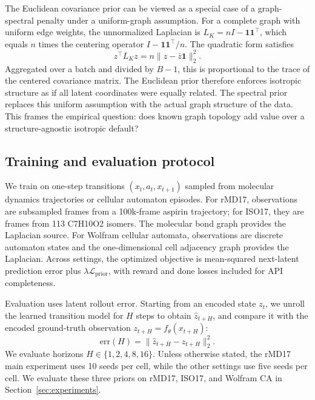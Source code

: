 The Euclidean covariance prior can be viewed as a special case of a graph-spectral penalty under a uniform-graph assumption. For a complete graph with uniform edge weights, the unnormalized Laplacian is \(L_K = n I - \mathbf{1}\mathbf{1}^\top\), which equals \(n\) times the centering operator \(I - \mathbf{1}\mathbf{1}^\top/n\). The quadratic form satisfies
\begin{equation}
z^\top L_K z = n \|z-\bar{z}\mathbf{1}\|_2^2 .
\end{equation}
Aggregated over a batch and divided by \(B-1\), this is proportional to the trace of the centered covariance matrix. The Euclidean prior therefore enforces isotropic structure as if all latent coordinates were equally related. The spectral prior replaces this uniform assumption with the actual graph structure of the data. This frames the empirical question: does known graph topology add value over a structure-agnostic isotropic default?

\subsection{Training and evaluation protocol}\label{sec:protocol}

We train on one-step transitions \((x_t,a_t,x_{t+1})\) sampled from molecular dynamics trajectories or cellular automaton episodes. For rMD17, observations are subsampled frames from a 100k-frame aspirin trajectory; for ISO17, they are frames from 113 C7H10O2 isomers. The molecular bond graph provides the Laplacian source. For Wolfram cellular automata, observations are discrete automaton states and the one-dimensional cell adjacency graph provides the Laplacian. Across settings, the optimized objective is mean-squared next-latent prediction error plus \(\lambda \mathcal{L}_{\mathrm{prior}}\), with reward and done losses included for API completeness.

Evaluation uses latent rollout error. Starting from an encoded state \(z_t\), we unroll the learned transition model for \(H\) steps to obtain \(\hat{z}_{t+H}\), and compare it with the encoded ground-truth observation \(z_{t+H}=f_\theta(x_{t+H})\):
\begin{equation}
\mathrm{err}(H) = \|\hat{z}_{t+H}-z_{t+H}\|_2^2 .
\end{equation}
We evaluate horizons \(H \in \{1,2,4,8,16\}\). Unless otherwise stated, the rMD17 main experiment uses 10 seeds per cell, while the other settings use five seeds per cell. We evaluate these three priors on rMD17, ISO17, and Wolfram CA in Section~\ref{sec:experiments}.
